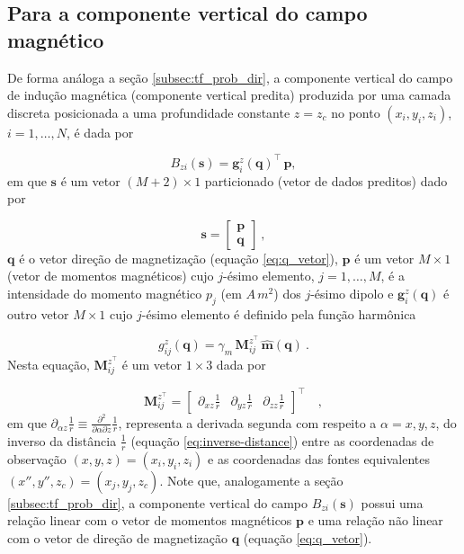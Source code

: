 \subsection{Para a componente vertical do campo magnético}
\label{subsec:bz_prob_dir}

De forma análoga a seção \ref{subsec:tf_prob_dir}, a componente vertical do campo de indução magnética (componente vertical predita) produzida por uma camada discreta posicionada a uma profundidade constante $z=z_c$ no ponto $(x_i,y_i,z_i)$, $i=1,\dots,N$, é dada por 

\begin{equation}
B_{zi} (\mathbf{s})  = \mathbf{g}_{i}^{z}(\mathbf{q})^{\top} \, \mathbf{p},
\label{eq:pred_data_ith-z}
\end{equation}
em que $\mathbf{s}$ é um vetor $(M + 2) \times 1$ particionado (vetor de dados preditos) dado por 

\begin{equation}
      \mathbf{s} = \begin{bmatrix}
		\mathbf{p} \\
		\mathbf{q}
	\end{bmatrix} \: ,
	\label{eq:parameter-vector-z}
\end{equation}
$\mathbf{q}$ é o vetor direção de magnetização (equação \ref{eq:q_vetor}), $\mathbf{p}$ é um vetor $M \times 1$ (vetor de momentos magnéticos) cujo $j$-ésimo elemento, $j=1,\dots,M$, é a intensidade do momento magnético $p_{j}$ (em $A \, m^{2}$) dos $j$-ésimo dipolo e $\mathbf{g}_{i}^{z} (\mathbf{q})$ é outro vetor $M \times 1$ cujo $j$-ésimo elemento é definido pela função harmônica 

\begin{equation}
g_{ij}^{z}(\mathbf{q})  = \gamma_m \, \mathbf{M}_{ij}^{z^\top} \, \hat{\mathbf{m}}(\mathbf{q}) \: .
\label{eq:g_ij-z}
\end{equation}
Nesta equação, $\mathbf{M}_{ij}^{z^\top}$ é um vetor $1 \times 3$ dada por 

\begin{equation}
\mathbf{M}_{ij}^{z^\top} = \begin{bmatrix}
\partial_{xz} \frac{1}{r} & 
\partial_{yz} \frac{1}{r} &
\partial_{zz} \frac{1}{r}
\end{bmatrix}^\top \quad ,
\label{eq:Mij-matrix-z}
\end{equation}
em que $\partial_{\alpha z} \frac{1}{r} \equiv \frac{\partial^{2}}{\partial \alpha \partial z} \frac{1}{r}$, representa a derivada segunda com respeito a $\alpha = x, y, z$, do inverso da distância $\frac{1}{r}$ (equação \ref{eq:inverse-distance}) entre as coordenadas de observação $(x, y, z) = (x_{i}, y_{i}, z_{i})$ e as coordenadas das fontes equivalentes $(x'', y'', z_{c}) = (x_{j}, y_{j}, z_{c})$. Note que, analogamente a seção \ref{subsec:tf_prob_dir}, a componente vertical do campo $B_{zi}(\mathbf{s})$ possui uma relação linear com o vetor de momentos magnéticos $\mathbf{p}$ e uma relação não linear com o vetor de direção de magnetização $\mathbf{q}$ (equação \ref{eq:q_vetor}).


